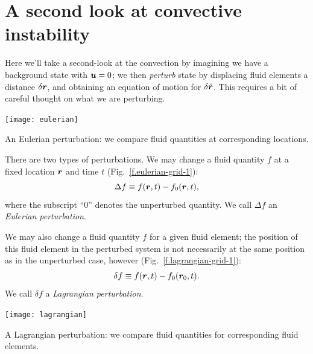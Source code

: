 \section{A second look at convective instability}\label{s.convection-second-look}

Here we'll take a second-look at the convection by imagining we have a background state with $\bm{u}=0$; we then \emph{perturb} state by displacing fluid elements a distance $\delta\bm{r}$, and obtaining an equation of motion for $\delta\ddot{\bm{r}}$.  This requires a bit of careful thought on what we are perturbing.

\begin{marginfigure}
\texttt{[image: eulerian]}
\caption{\label{f.eulerian-grid-1} An Eulerian perturbation: we compare fluid quantities at corresponding locations.}
\end{marginfigure}
There are two types of perturbations. We may change a fluid quantity $f$ at a fixed location $\bm{r}$ and time $t$ (Fig.~\ref{f.eulerian-grid-1}):
\begin{equation}\label{e.eulerian-perturbation}
  \Delta f \equiv f(\bm{r},t)-f_{0}(\bm{r},t),
\end{equation}
where the subscript ``0'' denotes the unperturbed quantity.  We call $\Delta f$ an \emph{Eulerian perturbation}.  

We may also change a fluid quantity $f$ for a given fluid element; the position of this fluid element in the perturbed system is not necessarily at the same position as in the unperturbed case, however (Fig.~\ref{f.lagrangian-grid-1}):
\begin{equation}\label{e.lagrangian-perturbation}
 \delta f \equiv f(\bm{r},t) - f_{0}(\bm{r}_{0},t).
\end{equation}
We call $\delta f$ a \emph{Lagrangian perturbation}. 
\begin{marginfigure}
\texttt{[image: lagrangian]}
\caption{\label{f.lagrangian-grid-1} A Lagrangian perturbation: we compare fluid quantities for corresponding fluid elements.}
\end{marginfigure}

